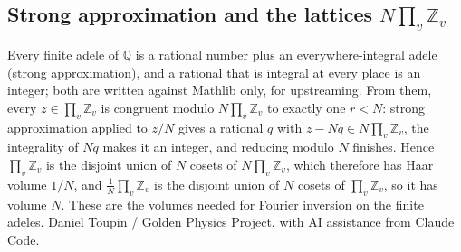 \documentclass{report}
\theoremstyle{definition}
\begin{document}
\begin{itemize}
\begin{itemize}
\section{Strong approximation and the lattices $N\prod_v\mathbb Z_v$}
Every finite adele of $\mathbb Q$ is a rational number plus an everywhere-integral adele (strong approximation), and a rational that is integral at every place is an integer; both are written against Mathlib only, for upstreaming. From them, every $z\in\prod_v\mathbb Z_v$ is congruent modulo $N\prod_v\mathbb Z_v$ to exactly one $r<N$: strong approximation applied to $z/N$ gives a rational $q$ with $z-Nq\in N\prod_v\mathbb Z_v$, the integrality of $Nq$ makes it an integer, and reducing modulo $N$ finishes. Hence $\prod_v\mathbb Z_v$ is the disjoint union of $N$ cosets of $N\prod_v\mathbb Z_v$, which therefore has Haar volume $1/N$, and $\tfrac1N\prod_v\mathbb Z_v$ is the disjoint union of $N$ cosets of $\prod_v\mathbb Z_v$, so it has volume $N$. These are the volumes needed for Fourier inversion on the finite adeles.
Daniel Toupin / Golden Physics Project, with AI assistance from Claude Code.


\end{itemize}
\end{itemize}
\end{document}
